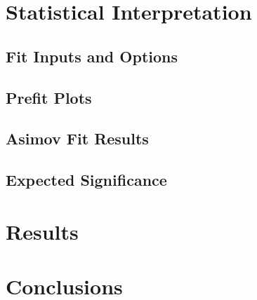 \documentclass[edeposit,fullpage]{latex/uiucthesis2009}
\begin{document}
\chapter{Statistical Interpretation}
\section{Fit Inputs and Options}
\section{Prefit Plots}
\section{Asimov Fit Results}
\section{Expected Significance}

\chapter{Results}

\chapter{Conclusions}



\mainmatter

%

%

%

%

\appendix


\backmatter


%

\end{document}
